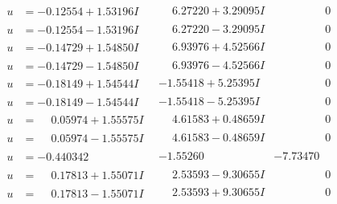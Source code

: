 \documentclass[1p]{elsarticle_modified}
\theoremstyle{definition}
\begin{document}
$$\begin{array}{c|c|c}
\begin{aligned}
u &= -0.12554 + 1.53196 I\end{aligned}
 & \phantom{-}6.27220 + 3.29095 I & \phantom{-0.000000 } 0 \\ \hline\begin{aligned}
u &= -0.12554 - 1.53196 I\end{aligned}
 & \phantom{-}6.27220 - 3.29095 I & \phantom{-0.000000 } 0 \\ \hline\begin{aligned}
u &= -0.14729 + 1.54850 I\end{aligned}
 & \phantom{-}6.93976 + 4.52566 I & \phantom{-0.000000 } 0 \\ \hline\begin{aligned}
u &= -0.14729 - 1.54850 I\end{aligned}
 & \phantom{-}6.93976 - 4.52566 I & \phantom{-0.000000 } 0 \\ \hline\begin{aligned}
u &= -0.18149 + 1.54544 I\end{aligned}
 & -1.55418 + 5.25395 I & \phantom{-0.000000 } 0 \\ \hline\begin{aligned}
u &= -0.18149 - 1.54544 I\end{aligned}
 & -1.55418 - 5.25395 I & \phantom{-0.000000 } 0 \\ \hline\begin{aligned}
u &= \phantom{-}0.05974 + 1.55575 I\end{aligned}
 & \phantom{-}4.61583 + 0.48659 I & \phantom{-0.000000 } 0 \\ \hline\begin{aligned}
u &= \phantom{-}0.05974 - 1.55575 I\end{aligned}
 & \phantom{-}4.61583 - 0.48659 I & \phantom{-0.000000 } 0 \\ \hline\begin{aligned}
u &= -0.440342\phantom{ +0.000000I}\end{aligned}
 & -1.55260\phantom{ +0.000000I} & -7.73470\phantom{ +0.000000I} \\ \hline\begin{aligned}
u &= \phantom{-}0.17813 + 1.55071 I\end{aligned}
 & \phantom{-}2.53593 - 9.30655 I & \phantom{-0.000000 } 0 \\ \hline\begin{aligned}
u &= \phantom{-}0.17813 - 1.55071 I\end{aligned}
 & \phantom{-}2.53593 + 9.30655 I & \phantom{-0.000000 } 0 \\ \hline\begin{aligned}

\end{aligned}
\end{array}$$
\end{document}
